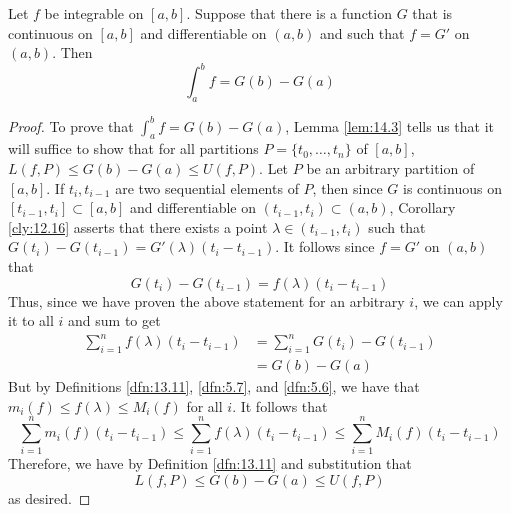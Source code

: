 \documentclass[../main.tex]{subfiles}
\begin{document}
\begin{theorem}\label{trm:14.4}
    Let $f$ be integrable on $[a,b]$. Suppose that there is a function $G$ that is continuous on $[a,b]$ and differentiable on $(a,b)$ and such that $f=G'$ on $(a,b)$. Then
    \begin{equation*}
        \int_a^bf = G(b)-G(a)
    \end{equation*}
    \begin{proof}
        To prove that $\int_a^bf=G(b)-G(a)$, Lemma \ref{lem:14.3} tells us that it will suffice to show that for all partitions $P=\{t_0,\dots,t_n\}$ of $[a,b]$, $L(f,P)\leq G(b)-G(a)\leq U(f,P)$. Let $P$ be an arbitrary partition of $[a,b]$. If $t_i,t_{i-1}$ are two sequential elements of $P$, then since $G$ is continuous on $[t_{i-1},t_i]\subset[a,b]$ and differentiable on $(t_{i-1},t_i)\subset(a,b)$, Corollary \ref{cly:12.16} asserts that there exists a point $\lambda\in(t_{i-1},t_i)$ such that $G(t_i)-G(t_{i-1})=G'(\lambda)(t_i-t_{i-1})$. It follows since $f=G'$ on $(a,b)$ that
        \begin{equation*}
            G(t_i)-G(t_{i-1}) = f(\lambda)(t_i-t_{i-1})
        \end{equation*}
        Thus, since we have proven the above statement for an arbitrary $i$, we can apply it to all $i$ and sum to get
        \begin{align*}
            \sum_{i=1}^nf(\lambda)(t_i-t_{i-1}) &= \sum_{i=1}^nG(t_i)-G(t_{i-1})\\
            &= G(b)-G(a)
        \end{align*}
        But by Definitions \ref{dfn:13.11}, \ref{dfn:5.7}, and \ref{dfn:5.6}, we have that $m_i(f)\leq f(\lambda)\leq M_i(f)$ for all $i$. It follows that
        \begin{equation*}
            \sum_{i=1}^nm_i(f)(t_i-t_{i-1}) \leq \sum_{i=1}^nf(\lambda)(t_i-t_{i-1})
            \leq \sum_{i=1}^nM_i(f)(t_i-t_{i-1})
        \end{equation*}
        Therefore, we have by Definition \ref{dfn:13.11} and substitution that
        \begin{equation*}
            L(f,P) \leq G(b)-G(a) \leq U(f,P)
        \end{equation*}
        as desired.
    \end{proof}
\end{theorem}
\end{document}
